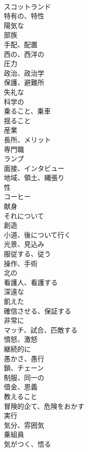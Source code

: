 \documentclass[8pt]{extreport}
\begin{document}
\begin{CJK}{UTF8}{min}
\\	スコットランド	
\\	特有の、特性	
\\	陽気な	
\\	部族	
\\	手配、配置	
\\	西の、西洋の	
\\	圧力	
\\	政治、政治学	
\\	保護、避難所	
\\	失礼な	
\\	科学の	
\\	乗ること、乗車	
\\	揺ること	
\\	産業	
\\	長所、メリット	
\\	専門職	
\\	ランプ	
\\	面接、インタビュー	
\\	地域、領土、縄張り	
\\	性	
\\	コーヒー	
\\	献身	
\\	それについて	
\\	創造	
\\	小道、後について行く	
\\	光景、見込み	
\\	服従する、従う	
\\	操作、手術	
\\	北の	
\\	看護人、看護する	
\\	深遠な	
\\	飢えた	
\\	確信させる、保証する	
\\	非常に	
\\	マッチ、試合、匹敵する	
\\	憤怒、激怒	
\\	継続的に	
\\	愚かさ、愚行	
\\	鎖、チェーン	
\\	制服、同一の	
\\	借金、恩義	
\\	教えること	
\\	冒険的企て、危険をおかす	
\\	実行	
\\	気分、雰囲気	
\\	乗組員	
\\	気がつく、悟る	

\end{CJK}
\end{document}
